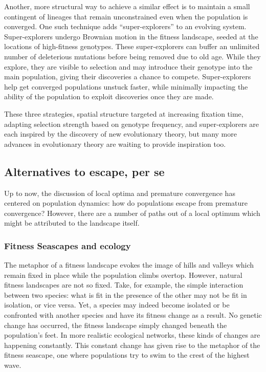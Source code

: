 Another, more structural way to achieve a similar effect is to maintain a small contingent of lineages that remain unconstrained even when the population is converged.
One such technique adds ``super-explorers'' \citep{ragusa2022augmenting} to an evolving system.
Super-explorers undergo Brownian motion in the fitness landscape, seeded at the locations of high-fitness genotypes.
These super-explorers can buffer an unlimited number of deleterious mutations before being removed due to old age.
While they explore, they are visible to selection and may introduce their genotype into the main population, giving their discoveries a chance to compete.
Super-explorers help get converged populations unstuck faster, while minimally impacting the ability of the population to exploit discoveries once they are made.


These three strategies, spatial structure targeted at increasing fixation time, adapting selection strength based on genotype frequency, and super-explorers are each inspired by the discovery of new evolutionary theory, but many more advances in evolutionary theory are waiting to provide inspiration too.

\subsection{Alternatives to escape, per se}

Up to now, the discussion of local optima and premature convergence has centered on population dynamics: how do populations escape from premature convergence?
However, there are a number of paths out of a local optimum which might be attributed to the landscape itself.

\subsubsection{Fitness Seascapes and ecology}

The metaphor of a fitness landscape evokes the image of hills and valleys which remain fixed in place while the population climbs overtop.
However, natural fitness landscapes are not so fixed.
Take, for example, the simple interaction between two species: what is fit in the presence of the other may not be fit in isolation, or vice versa.
Yet, a species may indeed become isolated or be confronted with another species and have its fitness change as a result.
No genetic change has occurred, the fitness landscape simply changed beneath the population's feet.
In more realistic ecological networks, these kinds of changes are happening constantly.
This constant change has given rise to the metaphor of the fitness seascape, one where populations try to swim to the crest of the highest wave.

